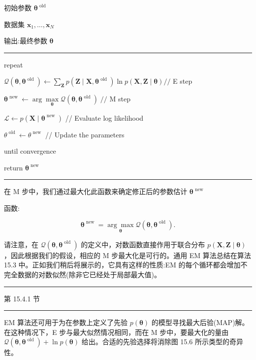 \documentclass[10pt]{article}
\newcommand{\HRule}{\begin{center}\rule{0.9\linewidth}{0.2mm}\end{center}}
\begin{document}
初始参数 \({\mathbf{\theta }}^{\text{ old }}\)

数据集 \({\mathbf{x}}_{1},\ldots ,{\mathbf{x}}_{N}\)

输出:最终参数 \(\mathbf{\theta }\)

\HRule

repeat

\hspace*{1em} \(\mathcal{Q}\left( {\mathbf{\theta },{\mathbf{\theta }}^{\text{ old }}}\right)  \leftarrow  \mathop{\sum }\limits_{\mathbf{Z}}p\left( {\mathbf{Z} \mid  \mathbf{X},{\mathbf{\theta }}^{\text{ old }}}\right) \ln p\left( {\mathbf{X},\mathbf{Z} \mid  \mathbf{\theta }}\right) //\) E step

\hspace*{1em} \({\mathbf{\theta }}^{\text{ new }} \leftarrow  \arg \mathop{\max }\limits_{\mathbf{\theta }}\mathcal{Q}\left( {\mathbf{\theta },{\mathbf{\theta }}^{\text{ old }}}\right) \;//\) M step

\hspace*{1em} \(\mathcal{L} \leftarrow  p\left( {\mathbf{X} \mid  {\mathbf{\theta }}^{\text{ new }}}\right)\) // Evaluate log likelihood

\hspace*{1em} \({\theta }^{\text{ old }} \leftarrow  {\theta }^{\text{ new }}\) // Update the parameters

until convergence

return \({\mathbf{\theta }}^{\text{ new }}\)

\HRule

在 M 步中，我们通过最大化此函数来确定修正后的参数估计 \({\mathbf{\theta }}^{\text{ new }}\)

函数:

\[
{\mathbf{\theta }}^{\text{ new }} = \underset{\mathbf{\theta }}{\arg \max }\mathcal{Q}\left( {\mathbf{\theta },{\mathbf{\theta }}^{\text{ old }}}\right) . \tag{15.24}
\]

请注意，在 \(\mathcal{Q}\left( {\mathbf{\theta },{\mathbf{\theta }}^{\text{ old }}}\right)\) 的定义中，对数函数直接作用于联合分布 \(p\left( {\mathbf{X},\mathbf{Z} \mid  \mathbf{\theta }}\right)\) ，因此根据我们的假设，相应的 M 步最大化是可行的。通用 EM 算法总结在算法 15.3 中。正如我们稍后将展示的，它具有这样的性质:EM 的每个循环都会增加不完全数据的对数似然(除非它已经处于局部最大值)。

\HRule

第 15.4.1 节

\HRule

EM 算法还可用于为在参数上定义了先验 \(p\left( \mathbf{\theta }\right)\) 的模型寻找最大后验(MAP)解。在这种情况下，E 步与最大似然情况相同，而在 \(\mathrm{M}\) 步中，要最大化的量由 \(\mathcal{Q}\left( {\mathbf{\theta },{\mathbf{\theta }}^{\text{ old }}}\right)  + \ln p\left( \mathbf{\theta }\right)\) 给出。合适的先验选择将消除图 15.6 所示类型的奇异性。
\end{document}
